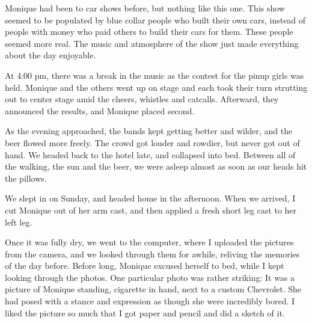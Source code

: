 Monique had been to car shows before, but nothing like this one. This show seemed to be
populated by blue collar people who built their own cars, instead of people with money who paid
others to build their cars for them. These people seemed more real. The music and atmosphere of
the show just made everything about the day enjoyable.

At 4:00 pm, there was a break in the music as the contest for the pinup girls was held.
Monique and the others went up on stage and each took their turn strutting out to center stage
amid the cheers, whistles and catcalls. Afterward, they announced the results, and Monique
placed second.

As the evening approached, the bands kept getting better and wilder, and the beer flowed more
freely. The crowd got louder and rowdier, but never got out of hand. We headed back to the hotel
late, and collapsed into bed. Between all of the walking, the sun and the beer, we were asleep
almost as soon as our heads hit the pillows.

We slept in on Sunday, and headed home in the afternoon. When we arrived, I cut Monique out of
her arm cast, and then applied a fresh short leg cast to her left leg.

Once it was fully dry, we went to the computer, where I uploaded the pictures from the camera,
and we looked through them for awhile, reliving the memories of the day before. Before long,
Monique excused herself to bed, while I kept looking through the photos. One particular photo
was rather striking: It was a picture of Monique standing, cigarette in hand, next to a custom
Chevrolet. She had posed with a stance and expression as though she were incredibly bored. I
liked the picture so much that I got paper and pencil and did a sketch of it.


